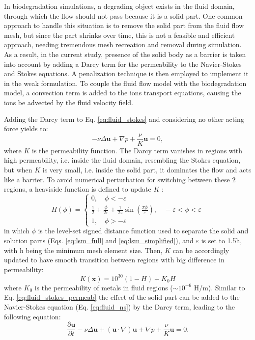 In biodegradation simulations, a degrading object exists in the fluid domain, through which the flow should not pass because it is a solid part. One common approach to handle this situation is to remove the solid part from the fluid flow mesh, but since the part shrinks over time, this is not a feasible and efficient approach, needing tremendous mesh recreation and removal during simulation. As a result, in the current study, presence of the solid body as a barrier is taken into account by adding a Darcy term for the permeability to the Navier-Stokes and Stokes equations. A penalization technique is then employed to implement it in the weak formulation. To couple the fluid flow model with the biodegradation model, a convection term is added to the ions transport equations, causing the ions be advected by the fluid velocity field.

Adding the Darcy  term to Eq. \ref{eq:fluid_stokes} and considering no other acting force yields to:
\begin{equation} \label{eq:fluid_stokes_permeab}
- \nu\Delta \mathbf{u} + \nabla p + \frac{\nu}{K} \mathbf{u} = 0,
\end{equation}
where $K$ is the permeability function. The Darcy term vanishes in regions with high permeability, i.e. inside the fluid domain, resembling the Stokes equation, but when $K$ is very small, i.e. inside the solid part, it dominates the flow and acts like a barrier. To avoid numerical perturbation for switching between these 2 regions, a heaviside function is defined to update $K$ \cite{Guyot2016}:
\begin{equation}
H(\phi)=\left\{\begin{array}{l}
0, \quad \phi<-\varepsilon \\
\frac{1}{2}+\frac{\phi}{2 \varepsilon}+\frac{1}{2 \pi} \sin \left(\frac{\pi \phi}{\varepsilon}\right), \quad-\varepsilon<\phi<\varepsilon \\
1, \quad \phi>-\varepsilon
\end{array}\right.
\end{equation}
in which $\phi$ is the level-set signed distance function used to separate the solid and solution parts (Eqs. \ref{eq:lsm_full} and \ref{eq:lsm_simplified}), and $\varepsilon$ is set to 1.5h, with h being the minimum mesh element size. Then, $K$ can be accordingly updated to have smooth transition between regions with big difference in permeability:
\begin{equation}
K(\boldsymbol{x})=10^{30}(1-H)+K_{0} H
\end{equation}
where $K_{0}$ is the permeability of metals in fluid regions ($\sim10^{-6}$ H/m). Similar to Eq. \ref{eq:fluid_stokes_permeab} the effect of the solid part can be added to the Navier-Stokes equation (Eq. \ref{eq:fluid_ns}) by the Darcy term, leading to the following equation:
\begin{equation}  \label{eq:fluid_ns_permeab}
\frac{{\partial {\mathbf{u}}}}{{\partial t}} - \nu\Delta{\mathbf{u}} + \left( {{\mathbf{u}} \cdot \nabla } \right) {\mathbf{u}} + \nabla p + \frac{\nu}{K} \mathbf{u} = 0.
\end{equation}

